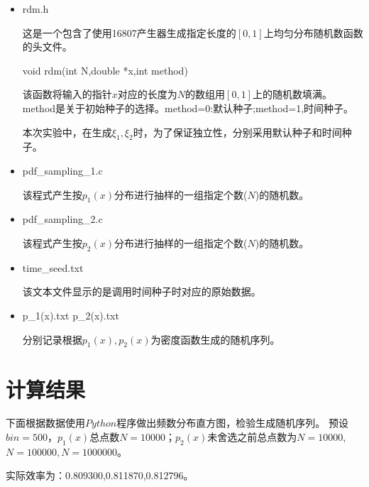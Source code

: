 \documentclass[UTF8]{ctexart}
\begin{document}
	\begin{itemize}
		\item rdm.h
		
		这是一个包含了使用16807产生器生成指定长度的$[0,1]$上均匀分布随机数函数的头文件。
		
		\subitem void rdm(int N,double *x,int method)
		
		该函数将输入的指针$x$对应的长度为$N$的数组用$[0,1]$上的随机数填满。method是关于初始种子的选择。method=0:默认种子;method=1,时间种子。
		
		本次实验中，在生成$\xi_1,\xi_2$时，为了保证独立性，分别采用默认种子和时间种子。
		\item pdf\_sampling\_1.c 
		
		该程式产生按$p_1(x)$分布进行抽样的一组指定个数($N$)的随机数。	
		
		\item pdf\_sampling\_2.c
		
		该程式产生按$p_2(x)$分布进行抽样的一组指定个数($N$)的随机数。
		
		\item time\_seed.txt
		
		该文本文件显示的是调用时间种子时对应的原始数据。
		
		\item p\_1(x).txt p\_2(x).txt
		
		分别记录根据$p_1(x),p_2(x)$为密度函数生成的随机序列。
	\end{itemize}
	
	\section{计算结果}

		下面根据数据使用$ Python $程序做出频数分布直方图，检验生成随机序列。
			预设$bin=500$，$p_1(x)$总点数$N=10000$；$p_2(x)$未舍选之前总点数为$N=10000$,$N=100000,N=1000000$。
			
			实际效率为：0.809300,0.811870,0.812796。


\end{document}
